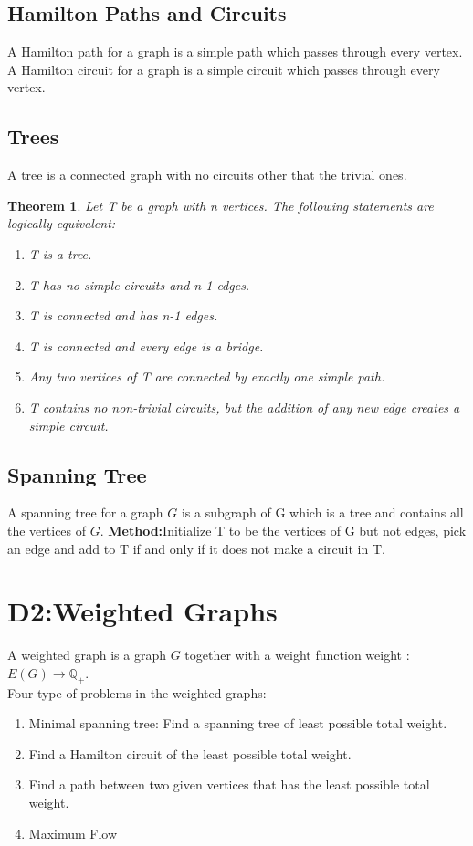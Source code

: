 \documentclass{article}
\newtheorem{thm}{Theorem}
\begin{document}
\begin{spacing}{1.5}
\subsection{Hamilton Paths and Circuits}
A Hamilton path for a graph is a simple path which passes through every vertex. 
A Hamilton circuit for a graph is a simple circuit which passes through every vertex. 
\subsection{Trees}
A tree is a connected graph with no circuits other that the trivial ones. 
\begin{thm}
    Let T be a graph with n vertices. The following statements are logically equivalent:
    \begin{enumerate}
        \item T is a tree.
        \item T has no simple circuits and n-1 edges.
        \item T is connected and has n-1 edges.
        \item T is connected and every edge is a bridge. 
        \item Any two vertices of T are connected by exactly one simple path. 
        \item T contains no non-trivial circuits, but the addition of any new edge creates a simple circuit. 
    \end{enumerate}
\end{thm}
\subsection{Spanning Tree}
A spanning tree for a graph $G$ is a subgraph of G which is a tree and contains all the vertices of $G$.  
\textbf{Method:}Initialize T to be the vertices of G but not edges, pick an edge and add to T if and only if it does not make a circuit in T. 
\section{D2:Weighted Graphs}
A weighted graph is a graph $G$ together with a weight function weight : $E(G) \rightarrow \mathbb{Q}_+ $. \\
Four type of problems in the weighted graphs:
\begin{enumerate}
    \item Minimal spanning tree:
    Find a spanning tree of least possible total weight.
    \item Find a Hamilton circuit of the least possible total weight.
    \item Find a path between two given vertices that has the least possible total weight.
    \item Maximum Flow 
\end{enumerate}

\end{spacing}
\end{document}
